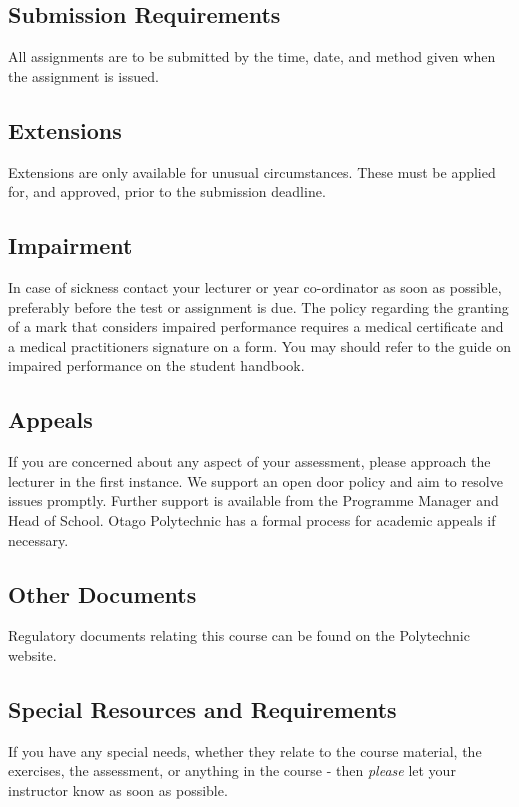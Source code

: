\documentclass{article}
\begin{document}
\subsection*{Submission Requirements}
All assignments are to be submitted by the time, date, and method given when the assignment is issued.

\subsection*{Extensions}
Extensions are only available for unusual circumstances.  These must be applied for, and approved, prior to the submission deadline.

\subsection*{Impairment}
In case of sickness contact your lecturer or year co-ordinator as soon as possible, preferably before the test or
assignment is due.  The policy regarding the granting of a mark that considers impaired performance requires a medical
certificate and a medical practitioners signature on a form. You may should refer to the guide on impaired performance
on the student handbook.

\subsection*{Appeals}
If you are concerned about any aspect of your assessment, please approach the lecturer in the first instance.  We support
an open door policy and aim to resolve issues promptly.  Further support is available from the Programme
Manager and Head of School. Otago Polytechnic has a formal process for academic appeals if necessary.

\subsection*{Other Documents}
Regulatory documents relating this course can be found on the Polytechnic website.




\subsection*{Special Resources and Requirements}
If you have any special needs, whether they relate to the course material, the exercises, the assessment, or anything in the course -
then \textit{please} let your instructor know as soon as possible.
\end{document}
